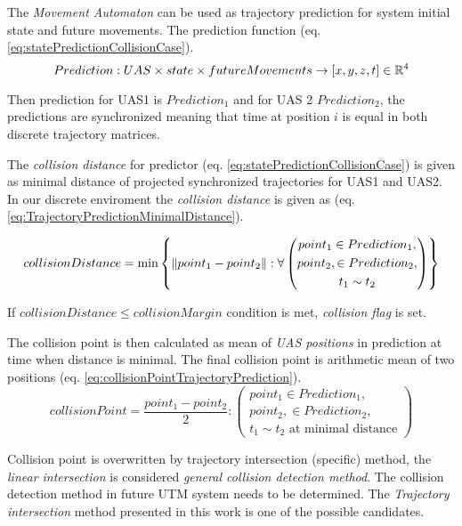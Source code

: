 The \emph{Movement Automaton} can be used as trajectory prediction for system initial state and future movements.  The prediction function (eq. \ref{eq:statePredictionCollisionCase}).
\begin{equation}\label{eq:statePredictionCollisionCase}
    Prediction: UAS \times state \times future Movements \to [x,y,z,t] \in \mathbb{R}^4
\end{equation}

\begin{note}
    Then prediction for UAS1 is $Prediction_1$ and for UAS 2 $Prediction_2$, the predictions are synchronized meaning that time at position $i$ is equal in both discrete trajectory matrices.
\end{note}

The \emph{collision distance} for predictor (eq. \ref{eq:statePredictionCollisionCase}) is given as minimal distance of projected synchronized trajectories for UAS1 and UAS2. In our discrete enviroment the \emph{collision distance} is given as (eq. \ref{eq:TrajectoryPredictionMinimalDistance}).

\begin{equation}\label{eq:TrajectoryPredictionMinimalDistance}
    collisionDistance = \text{min}\left\{\left\lVert point_1-point_2\right\rVert:\forall \left(\begin{gathered}point_1 \in Prediction_1,\\ point_2, \in Prediction_2,\\ t_1 \sim t_2 \end{gathered}\right)\right\} 
\end{equation}

If $collisionDistance \le collision Margin$  condition is met, \emph{collision flag} is set.  

The collision point is then calculated  as mean of \emph{UAS positions} in prediction at time when distance is minimal.  The final collision point is arithmetic mean of two positions (eq. \ref{eq:collisionPointTrajectoryPrediction}).
\begin{equation}\label{eq:collisionPointTrajectoryPrediction}
    collisionPoint= \frac{point_1 - point_2}{2}:\left(\begin{gathered}point_1 \in Prediction_1,\\ point_2, \in Prediction_2,\\ t_1 \sim t_2 \text{ at minimal distance}\end{gathered}\right)
\end{equation}

\begin{note}
    Collision point is overwritten by trajectory intersection (specific) method, the \emph{linear intersection} is considered \emph{general collision detection method}. The collision detection method in future UTM system needs to be determined. The \emph{Trajectory intersection} method presented in this work is one of the possible candidates. 
\end{note}

